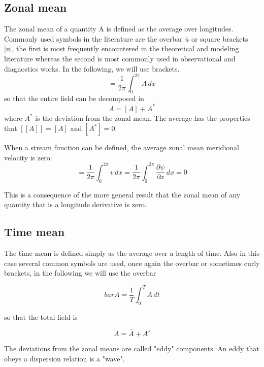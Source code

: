 \subsection{Zonal mean}
The zonal mean of a quantity A is defined as the average over longitudes. Commonly used symbols in the literature are the overbar $\overline{u}$ or square brackets [u], the first is most frequently encountered in the theoretical and modeling literature whereas the second is most commonly used in observational and diagnostics works. In the following, we will use brackets. 
\begin{equation}
    [A] = \frac{1}{2\pi}\int_0^{2\pi} A \, dx
\end{equation}
so that the entire field can be decomposed in
  \begin{equation}
    A = [A] + A^*
\end{equation}
where $A^*$ is the deviation from the zonal mean. 
 The average has the properties that \([[A]] = [A]\) and \([A^*]=0\).

When a stream function can be defined, the average zonal mean meridional
velocity is zero:
\begin{equation}
    = \frac{1}{2\pi}\int_0^{2\pi} v \, dx=\frac{1}{2\pi}\int_0^{2\pi} \frac{\partial \psi}{\partial x} \, dx=0
\end{equation}


This is a consequence of the more general result that the zonal mean of
any quantity that is a longitude derivative is zero.

\subsection{Time mean}
The time mean is defined simply as the average over a length of time.
Also in this case several common symbols are used, once again the
overbar or sometimes curly brackets, in the following we will use the
overbar


\begin{equation}
    bar{A} = \frac{1}{T}\int_0^{T} A \, dt
\end{equation}

so that the total field is

\begin{equation}
    A = \bar{A} + A'
\end{equation}

The deviations from the zonal means are called "eddy" components. An
eddy that obeys a dispersion relation is a "wave".

